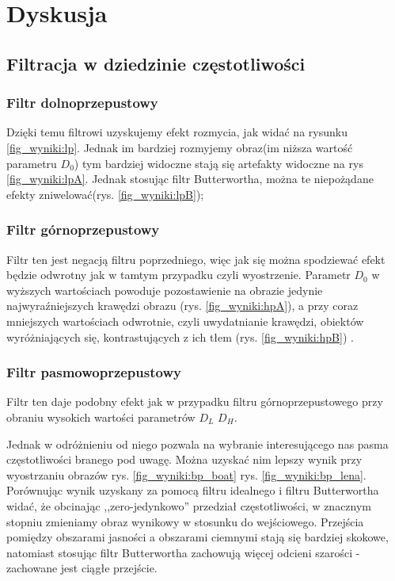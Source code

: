 \documentclass{classrep}
\begin{document}
\section{Dyskusja}

\subsection{Filtracja w dziedzinie częstotliwości}

\subsubsection{Filtr dolnoprzepustowy}

Dzięki temu filtrowi uzyskujemy efekt rozmycia, jak widać na rysunku \ref{fig_wyniki:lp}. Jednak im bardziej rozmyjemy obraz(im niższa wartość parametru $D_0$) tym bardziej widoczne stają się artefakty widoczne na rys \ref{fig_wyniki:lpA}. Jednak stosując filtr Butterwortha, można te niepożądane efekty zniwelować(rys. \ref{fig_wyniki:lpB});

\subsubsection{Filtr górnoprzepustowy}

Filtr ten jest negacją filtru poprzedniego, więc jak się można spodziewać efekt będzie odwrotny jak w tamtym przypadku czyli wyostrzenie. Parametr $D_0$ w wyższych wartościach powoduje pozostawienie na obrazie jedynie najwyraźniejszych krawędzi obrazu (rys. \ref{fig_wyniki:hpA}), a przy coraz mniejszych wartościach odwrotnie, czyli uwydatnianie krawędzi, obiektów wyróżniających się, kontrastujących z ich tłem (rys. \ref{fig_wyniki:hpB}) .

\subsubsection{Filtr pasmowoprzepustowy}

Filtr ten daje podobny efekt jak w przypadku filtru górnoprzepustowego przy obraniu wysokich wartości parametrów  $D_L$ $D_H$.

Jednak w odróżnieniu od niego pozwala na wybranie interesującego nas pasma częstotliwości branego pod uwagę. Można uzyskać nim lepszy wynik przy wyostrzaniu obrazów  rys. \ref{fig_wyniki:bp_boat}  rys. \ref{fig_wyniki:bp_lena}. Porównując wynik uzyskany za pomocą filtru idealnego i filtru Butterwortha widać, że obcinając ,,zero-jedynkowo'' przedział częstotliwości, w znacznym stopniu zmieniamy obraz wynikowy w stosunku do wejściowego. Przejścia pomiędzy obszarami jasności a obszarami ciemnymi stają się bardziej skokowe, natomiast stosując filtr Butterwortha zachowują więcej odcieni szarości - zachowane jest ciągłe przejście.
\end{document}
